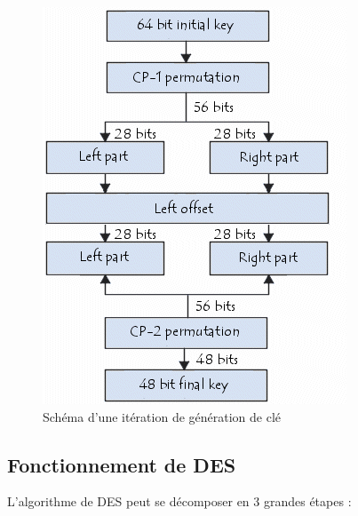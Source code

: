 \documentclass[a4paper,12pt]{article}
\begin{document}
\begin{figure}[h]
\centering
\includegraphics[scale=0.80]{./images/keygen.png}
\caption{Schéma d'une itération de génération de clé}
\label{fig:keygen}
\end{figure}

\clearpage

\subsection{Fonctionnement de DES}	

L'algorithme de DES peut se décomposer en 3 grandes étapes :
\end{document}
